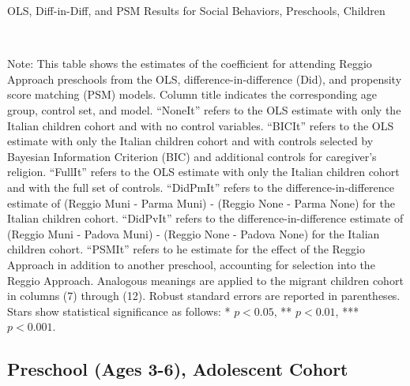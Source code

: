 \begin{landscape}
\begin{table}[H] \caption{OLS, Diff-in-Diff, and PSM Results for Social Behaviors, Preschools, Children} \label{ols-H-reg}
\scalebox{0.77}{
}
\vspace{1ex} \\
\footnotesize\raggedright{Note: This table shows the estimates of the coefficient for attending Reggio Approach preschools from the OLS, difference-in-difference (Did), and propensity score matching (PSM) models. Column title indicates the corresponding age group, control set, and model. ``NoneIt'' refers to the OLS estimate with only the Italian children cohort and with no control variables. ``BICIt'' refers to the OLS estimate with only the Italian children cohort and with controls selected by Bayesian Information Criterion (BIC) and additional controls for caregiver's religion. ``FullIt'' refers to the OLS estimate with only the Italian children cohort and with the full set of controls. ``DidPmIt'' refers to the difference-in-difference estimate of (Reggio Muni - Parma Muni) - (Reggio None - Parma None) for the Italian children cohort. ``DidPvIt'' refers to the difference-in-difference estimate of (Reggio Muni - Padova Muni) - (Reggio None - Padova None) for the Italian children cohort. ``PSMIt'' refers to he estimate for the effect of the Reggio Approach in addition to another preschool, accounting for selection into the Reggio Approach. Analogous meanings are applied to the migrant children cohort in columns (7) through (12). Robust standard errors are reported in parentheses. Stars show statistical significance as follows: * $p < 0.05$, ** $p < 0.01$, *** $p < 0.001$.}
\end{table}
\end{landscape}






\subsection{Preschool (Ages 3-6), Adolescent Cohort}

